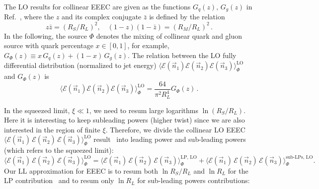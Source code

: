 \documentclass[letterpaper,11pt]{article}
\DeclareRobustCommand{\Ref}[1]{Ref.~\cite{#1}}
\begin{document}
 The LO results for collinear EEEC are given as the functions $G_q(z),\, G_g(z)$ in \Ref{Chen:2019bpb}, where the $z$ and its complex conjugate $\bar{z}$ is defined by the relation
\begin{equation}
z\bar{z} = (R_S/R_L)^2,\quad (1-z)(1-\bar{z}) = (R_M/R_L)^2\,.
\end{equation}
In the following, the source $\Phi$ denotes the mixing of collinear quark and gluon source with quark percentage $x\in [0,1]$, for example, $G_\Phi(z) \equiv x\, G_q(z) + (1-x)\, G_g(z)$. The relation between the LO fully differential distribution (normalized to jet energy) $\langle \mathcal{E}(\vec{n}_1)\mathcal{E}(\vec{n}_2)\mathcal{E}(\vec{n}_3)\rangle_\Phi^{\mathrm{LO}}$ and $G_\Phi(z)$ is 
\begin{equation}
\langle \mathcal{E}(\vec{n}_1)\mathcal{E}(\vec{n}_2)\mathcal{E}(\vec{n}_3)\rangle_\Phi^{\mathrm{LO}} = \frac{64}{\pi^2 R_L^4} G_\Phi(z)\,.
\end{equation}

In the squeezed limit, $\xi\ll 1$, we need to resum large logarithms $\ln (R_S/R_L)$.
%
Here it is interesting to keep subleading powers (higher twist) since we are also interested in the region of finite $\xi$.
%
Therefore, we divide the collinear LO EEEC $\langle \mathcal{E}(\vec{n}_1) \, \mathcal{E}(\vec{n}_2) \, \mathcal{E}(\vec{n}_3) \rangle_{\Phi}^{\mathrm{LO}}$ result~\cite{Chen:2019bpb} into leading power and sub-leading powers (which refers to the squeezed limit):
%
\begin{equation}
\langle \mathcal{E}(\vec{n}_1)\, \mathcal{E}(\vec{n}_2)\, \mathcal{E}(\vec{n}_3) \rangle_{\Phi}^{\mathrm{LO}} 
= \langle \mathcal{E}(\vec{n}_1)\, \mathcal{E}(\vec{n}_2)\, \mathcal{E}(\vec{n}_3) \rangle_{\Phi}^{\mathrm{LP,\,LO}} 
+ \langle \mathcal{E}(\vec{n}_1)\, \mathcal{E}(\vec{n}_2)\, \mathcal{E}(\vec{n}_3) \rangle_{\Phi}^{\mathrm{sub\text{-}LPs,\, LO}}.
\end{equation}
%
Our LL approximation for EEEC is to resum both $\ln R_S/R_L$ and  $\ln R_L$ for the LP contribution~\cite{Chen:2020adz,Chen:2021gdk} and to resum only $\ln R_L$ for sub-leading powers contributions:
\end{document}
